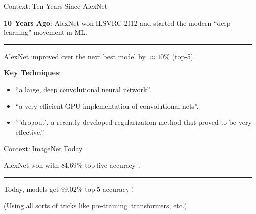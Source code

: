 \documentclass[usenames,dvipsnames,mathserif,notheorems]{beamer}
\newcommand{\horizontalrule}{
	{
			\vspace{-0.5em}
			\center \rule{\textwidth}{0.1em}
			\vspace{-0.2em}
		}
}
\begin{document}
\begin{frame}{Context: Ten Years Since AlexNet}

	{
		\large \textbf{10 Years Ago}: AlexNet won ILSVRC 2012 and started the modern ``deep learning'' movement in ML.
	}
	\pause

	\vspace{1em}

	\horizontalrule

	\vspace{1em}

	AlexNet improved over the next best model by \( \approx 10\% \) (top-5).

	\vspace{1em}

	\textbf{Key Techniques}:
	\begin{itemize}
		\item ``a large, deep convolutional neural network''.
		\item ``a very efficient GPU implementation of convolutional nets''.
		\item ``'dropout', a recently-developed regularization method that proved to be very effective.''
	\end{itemize}

\end{frame}

\begin{frame}{Context: ImageNet Today}

	\begin{center}
		\large AlexNet won with \( 84.69\% \) top-five accuracy \citep{krizhevsky2012alexnet}.
	\end{center}

	\pause
	\horizontalrule

	\begin{center}
		\large Today, models get \( 99.02\% \) top-5 accuracy \citep{yuan2021florence}!

		\vspace{3em}

		(Using all sorts of tricks like pre-training, transformers, etc.)
	\end{center}
\end{frame}


\end{document}
